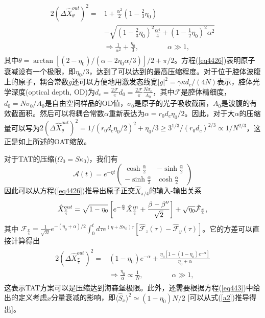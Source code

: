 \begin{align}\label{eq4426}
\begin{split}
2(\Delta\hat X_\theta^{out})^2 =& 1 + \frac{{{\alpha ^2}}}{2}\left( {1 - \frac{2}{3}{\eta _0}} \right)\\
&- \sqrt {{{\left( {1 - \frac{2}{3}{\eta _0}} \right)}}^2\frac{{{\alpha ^4}}}{4} + {{\left( {1 - \frac{1}{2}{\eta _0}} \right)}}^2{\alpha ^2}}\\
&\Rightarrow \frac{1}{\alpha^2}+\frac{\eta_0}{3},\qquad\qquad\alpha \gg 1,
\end{split}
\end{align}
其中$\theta=\arctan [(2-\eta_0)/(\alpha-2\eta_0\alpha/3)]/2+\pi/2$。方程(\ref{eq4426})表明原子衰减设有一个极限，即$\eta_0/3$，达到了可以达到的最高压缩程度。对于位于腔体波腹上的原子，耦合常数$g$还可以方便地用激发态线宽$|g|^2=\gamma\kappa d_c/(4N)$表示\cite{phd11}，腔体光学深度(optical depth, OD)为$d_c=\frac{2\mathcal {F}}{\pi}d_0=\frac{2\mathcal {F}}{\pi}\frac{N\sigma_0}{A_0}$，其中$\mathcal {F}$是腔体精细度，$d_0=N\sigma_0/A_0$是自由空间样品的OD值，$\sigma_0$是原子的光子吸收截面，$A_0$是波腹的有效截面积。然后可以将耦合常数$\alpha$重新表达为$\alpha=r_0 d_c\eta_0/2$。因此，对于大$\alpha$的压缩量可以写为$2(\Delta\hat X_\theta^{out})^2= 1/(r_0 d_c\eta_0/2)^2+\eta_0/3\geq 3^{1/3}/(r_0 d_c)^{2/3}\propto 1/N^{2/3}$，这正是如上所述的OAT缩放。

对于TAT的压缩($\Omega_0=S\kappa_0$)，我们有$$\mathcal{A}(t)=e^{-\eta t}\left( {\begin{array}{*{20}{c}}
	\cosh\frac{\alpha}{2}&-\sinh\frac{\alpha}{2} \\
	-\sinh\frac{\alpha}{2}&\cosh\frac{\alpha}{2}
	\end{array}} \right)$$因此可以从方程(\ref{eq4426})推导出原子正交$\hat X_{\pi/4}$的输入-输出关系
\begin{eqnarray}
\hat X_{\frac{\pi }{4}}^{out}{\rm{ }} = \sqrt {1 - {\eta _0}} \left[ {{e^{ - \frac{\alpha }{2}}}\hat X_{\frac{\pi }{4}}^{in} + \frac{{ {\beta  - \beta ''} }}{{\sqrt 2 }}} \right] + \sqrt {{\eta _0}} {\hat {\mathcal{F}}_{\frac{\pi }{4}}},\label{eq4427}
\end{eqnarray}
其中 ${\hat {\mathcal{F}}_{\frac{\pi }{4}}}=\frac{1}{\sqrt{2t}}e^{-(\eta_0+\alpha)/2}\int^t_0d\tau e^{(\eta+S\kappa_0)\tau}[{\hat {\mathcal{F}}_{z}}(\tau)-{\hat {\mathcal{F}}_{y}}(\tau)]$。它的方差可以直接计算得出
\begin{align}\label{eq4428}
\begin{split}
2(\Delta\hat X_{\frac{\pi }{4}}^{out})^2=
&\left(1-\eta_0\right)e^{-\alpha}+\frac{\eta_0\left[1-(1-\eta_0)e^{-\alpha}\right]}{\eta_0+\alpha}\\
&\Rightarrow \frac{\eta_0}{\alpha}\propto\frac{1}{N},\qquad\qquad\alpha\gg 1,
\end{split}
\end{align}
这表示TAT方案可以是压缩达到海森堡极限。此外，还需要根据方程(\ref{eq443})中给出的定义考虑$x$分量衰减的影响，即${\langle {\hat S_x}\rangle ^2} \simeq (1 - {\eta _0})N/2$  [可以从式(\ref{a2})推导得出]。

